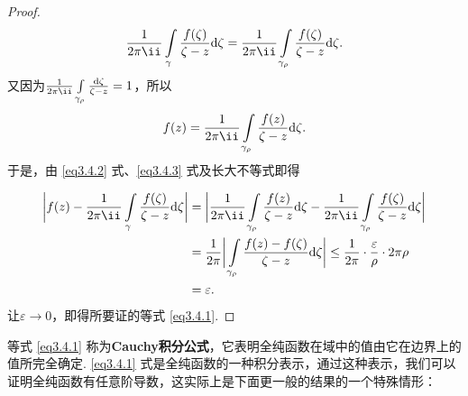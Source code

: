 \begin{proof}
\noindent\begin{minipage}{0.7\textwidth}
\begin{equation}\label{eq3.4.2}
\frac1{2\pi\ii}\int\limits_\gamma\frac{f(\zeta)}{\zeta-z}\textrm d\zeta
=\frac1{2\pi\ii}\int\limits_{\gamma_\rho}\frac{f(\zeta)}{\zeta-z}\textrm d\zeta.
\end{equation}
又因为$\frac1{2\pi\ii}\int\limits_{\gamma_\rho}\frac{\textrm d\zeta}{\zeta-z}=1$，所以
\begin{equation}\label{eq3.4.3}
f(z)=\frac1{2\pi\ii}\int\limits_{\gamma_\rho}\frac{f(z)}{\zeta-z}\textrm d\zeta.
\end{equation}
于是，由 \eqref{eq3.4.2} 式、\eqref{eq3.4.3} 式及长大不等式即得
\end{minipage}
\begin{minipage}{0.3\textwidth}
\centering
{}
\end{minipage}
\begin{align*}
\bigg|f(z)-\frac1{2\pi\ii}\int\limits_\gamma\frac{f(\zeta)}{\zeta-z}\textrm d\zeta\bigg|&=\bigg|\frac1{2\pi\ii}\int\limits_{\gamma_\rho}\frac{f(z)}{\zeta-z}\textrm d\zeta-\frac1{2\pi\ii}\int\limits_{\gamma_\rho}\frac{f(\zeta)}{\zeta-z}\textrm d\zeta\bigg|\\
&=\frac1{2\pi}\bigg|\int\limits_{\gamma_\rho}\frac{f(z)-f(\zeta)}{\zeta-z}\textrm d\zeta\bigg|\le\frac1{2\pi}\cdot\frac{\varepsilon}\rho\cdot2\pi\rho\\
&=\varepsilon.
\end{align*}
让$\varepsilon\to0$，即得所要证的等式 \eqref{eq3.4.1}.
\end{proof}

等式 \eqref{eq3.4.1} 称为\textbf{Cauchy积分公式}，它表明全纯函数在域中的值由它在边界上的值所完全确定. \eqref{eq3.4.1} 式是全纯函数的一种积分表示，通过这种表示，我们可以证明全纯函数有任意阶导数，这实际上是下面更一般的结果的一个特殊情形：

